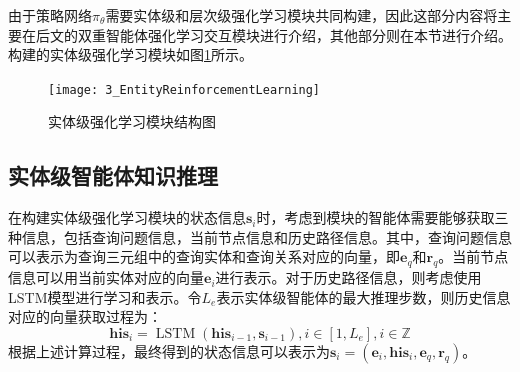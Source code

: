 \documentclass[algorithmlist, AutoFakeBold, AutoFakeSlant, figurelist, tablelist, nomlist, engineering]{seuthesix}
\begin{document}
由于策略网络$\pi_\theta$需要实体级和层次级强化学习模块共同构建，因此这部分内容将主要在后文的双重智能体强化学习交互模块进行介绍，其他部分则在本节进行介绍。构建的实体级强化学习模块如图\ref{3_EntityReinforcementLearning}所示。
\begin{figure}
  \centering
  \texttt{[image: 3\_EntityReinforcementLearning]}
  \caption{实体级强化学习模块结构图}
  \label{3_EntityReinforcementLearning}
\end{figure}

\subsection{实体级智能体知识推理}
在构建实体级强化学习模块的状态信息$\bm{s}_i$时，考虑到模块的智能体需要能够获取三种信息，包括查询问题信息，当前节点信息和历史路径信息。其中，查询问题信息可以表示为查询三元组中的查询实体和查询关系对应的向量，即$\bm{e}_q$和$\bm{r}_q$。当前节点信息可以用当前实体对应的向量$\bm{e}_i$进行表示。对于历史路径信息，则考虑使用LSTM模型进行学习和表示。令$L_e$表示实体级智能体的最大推理步数，则历史信息对应的向量获取过程为：
\begin{equation}
  \bm{his}_i=\operatorname{LSTM}\left(\bm{his}_{i - 1}, \bm{s}_{i - 1}\right), i \in [1, L_e], i \in \mathbb{Z}
  \label{equation_HistoryLSTM}
\end{equation}
根据上述计算过程，最终得到的状态信息可以表示为$\bm{s}_i = (\bm{e}_i, \bm{his}_i, \bm{e}_q, \bm{r}_q)$。
\end{document}
